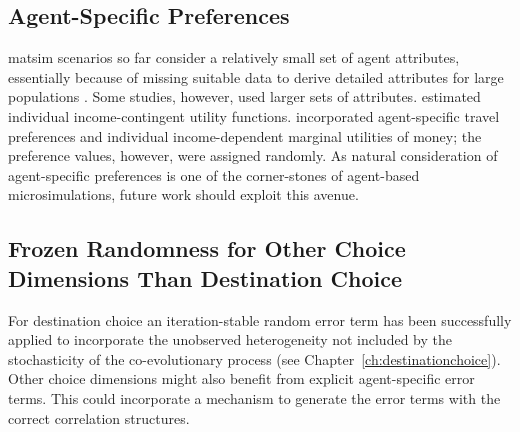 \subsection{Agent-Specific Preferences}
\label{sec:agent-specific-prefs}
\gls{matsim} scenarios so far consider a relatively small set of agent attributes, essentially because of missing suitable data to derive detailed attributes for large populations \citep[][]{MuellerFloetteroed_unpub_hEART_2014}. 
Some studies, however, used larger sets of attributes. 
\citet{GretherEtAl2010TrbIncomeInTRR, KickhoeferEtAl_Transportation_2011} estimated individual income-contingent utility functions. 
\citet[][]{HorniEtAl_TechRep_IVT_2012_a, HorniAxhausen_TechRep_IVT_2014} incorporated agent-specific travel preferences and individual income-dependent marginal utilities of money; the preference values, however, were assigned randomly. 
As natural consideration of agent-specific preferences is one of the corner-stones of agent-based \glspl{microsimulation}, future work should exploit this avenue. 


\subsection{Frozen Randomness for Other Choice Dimensions Than Destination Choice}
\label{sec:future-frozen-randomness}

For destination choice an iteration-stable random error term has been successfully applied to incorporate the unobserved heterogeneity not included by the stochasticity of the co-evolutionary process (see Chapter~\ref{ch:destinationchoice}). Other choice dimensions
might also benefit from explicit agent-specific error terms.  
This 
could incorporate a mechanism to generate the error terms with the correct correlation structures. 


